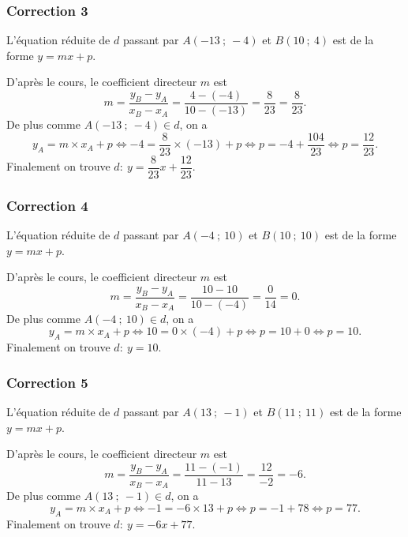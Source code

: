 \documentclass[15pt, mathserif]{beamer}
\begin{document}
\begin{frame}
\vspace{-10mm}
	\frametitle{Correction 3}
L'équation réduite de $d$ passant par $A\left(-13~;~-4\right)$ et $B\left(10~;~4\right)$ est de la forme $y = mx + p$.

D'après le cours, le coefficient directeur $m$ est \[m = \dfrac{y_B-y_A}{x_B-x_A} = \dfrac{4-\left(-4\right)}{10-\left(-13\right)} = \dfrac{8}{23} = \dfrac{8}{23}.\] De plus comme $A(-13~;~-4) \in d$, on a \[y_A = m \times x_A + p \Leftrightarrow -4 = \dfrac{8}{23}\times \left(-13\right) + p \Leftrightarrow p = -4+\dfrac{104}{23} \Leftrightarrow p = \dfrac{12}{23}.\] Finalement on trouve $d:~ y = \dfrac{8}{23}x+\dfrac{12}{23}$.\end{frame}


\begin{frame}
\vspace{-10mm}
	\frametitle{Correction 4}
L'équation réduite de $d$ passant par $A\left(-4~;~10\right)$ et $B\left(10~;~10\right)$ est de la forme $y = mx + p$.

D'après le cours, le coefficient directeur $m$ est \[m = \dfrac{y_B-y_A}{x_B-x_A} = \dfrac{10-10}{10-\left(-4\right)} = \dfrac{0}{14} = 0.\] De plus comme $A(-4~;~10) \in d$, on a \[y_A = m \times x_A + p \Leftrightarrow 10 = 0\times \left(-4\right) + p \Leftrightarrow p = 10+0 \Leftrightarrow p = 10.\] Finalement on trouve $d:~ y = 10$.\end{frame}


\begin{frame}
\vspace{-10mm}
	\frametitle{Correction 5}
L'équation réduite de $d$ passant par $A\left(13~;~-1\right)$ et $B\left(11~;~11\right)$ est de la forme $y = mx + p$.

D'après le cours, le coefficient directeur $m$ est \[m = \dfrac{y_B-y_A}{x_B-x_A} = \dfrac{11-\left(-1\right)}{11-13} = \dfrac{12}{-2} = -6.\] De plus comme $A(13~;~-1) \in d$, on a \[y_A = m \times x_A + p \Leftrightarrow -1 = -6\times 13 + p \Leftrightarrow p = -1+78 \Leftrightarrow p = 77.\] Finalement on trouve $d:~ y = -6x+77$.\end{frame}
\end{document}
